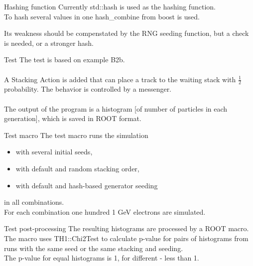 \documentclass[aspectratio=169, 14pt]{beamer}
\begin{document}
\begin{large}
  
 \begin{frame}{Hashing function}
  Currently std::hash is used as the hashing function.\\
  To hash several values in one hash\_combine from boost is used.
  
  
  Its weakness should be compenstated by the RNG seeding function,
  but a check is needed, or a stronger hash.
 \end{frame}
 
 \begin{frame}{Test}
  The test is based on example B2b.\\\ \\
  A Stacking Action is added that can place a track to the waiting stack with $\frac{1}{2}$ probability.
  The behavior is controlled by a messenger.\\\ \\
  
  The output of the program is a histogram [of number of particles in each generation], which is saved in ROOT format.
 \end{frame} 

 \begin{frame}{Test macro}
  The test macro runs the simulation
  \begin{itemize}
   \item with several initial seeds,
   \item with default and random stacking order,
   \item with default and hash-based generator seeding
  \end{itemize}
  in all combinations.\\
  For each combination one hundred 1 GeV electrons are simulated.
 \end{frame} 
 
 \begin{frame}{Test post-processing}
  The resulting histograms are processed by a ROOT macro.\\
  The macro uses TH1::Chi2Test to calculate p-value for pairs of histograms
  from runs with the same seed or the same stacking and seeding.\\
  The p-value for equal histograms is 1, for different - less than 1.
 \end{frame}
 

\end{large}
\end{document}
